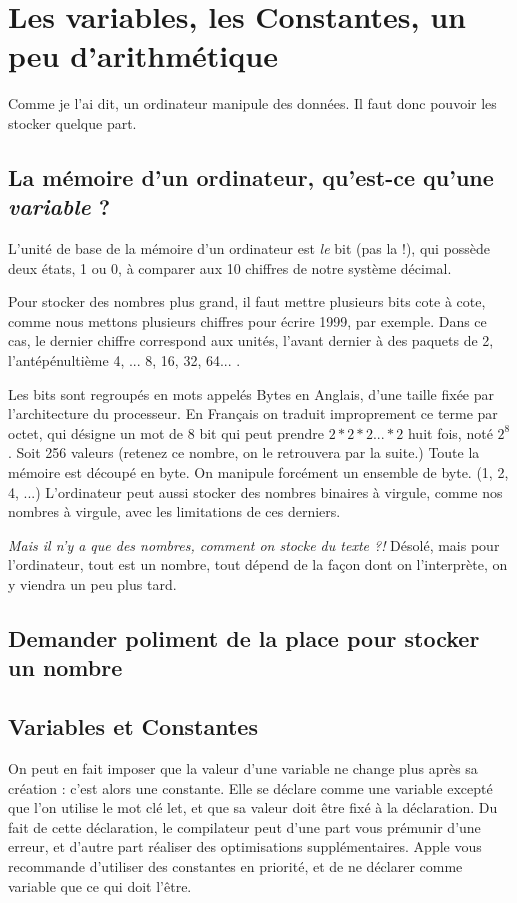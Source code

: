\chapter{Les variables, les Constantes, un peu d'arithmétique}
Comme je l'ai dit, un ordinateur manipule des données. Il faut donc pouvoir les stocker
quelque part.
\section{La mémoire d'un ordinateur, qu'est-ce qu'une \emph{variable} ?}
L'unité de base de la mémoire d'un ordinateur est \emph{le} bit (pas la !), qui possède deux états,
1 ou 0, à comparer aux 10 chiffres de notre système décimal.

Pour stocker des nombres
plus grand, il faut mettre plusieurs bits cote à cote, comme nous mettons plusieurs chiffres
pour écrire 1999, par exemple. Dans ce cas, le dernier chiffre correspond aux unités, l'avant dernier à
des paquets de 2, l'antépénultième 4, ... 8, 16, 32, 64... .

Les bits sont regroupés en mots
appelés Bytes en Anglais, d'une taille fixée par l'architecture du processeur. En Français
on traduit improprement ce terme par octet, qui désigne un mot de 8 bit qui peut prendre
\begin{math}2*2*2...*2\end{math} huit fois, noté \begin{math} 2^{8} \end{math}. Soit 256 valeurs (retenez ce nombre, on le retrouvera par la suite.)
Toute la mémoire est découpé en byte. On manipule forcément un ensemble de byte. (1,
2, 4, ...)
L'ordinateur peut aussi stocker des nombres binaires à virgule, comme nos nombres à virgule, avec les limitations de ces derniers. %

\emph{Mais il n'y a que des nombres, comment on stocke du texte ?!}
Désolé, mais pour l'ordinateur, tout est un nombre, tout dépend de la façon dont on
l'interprète, on y viendra un peu plus tard.
\section{Demander poliment de la place pour stocker un nombre}

\section{Variables et Constantes}
On peut en fait imposer que la valeur d'une variable ne change plus après sa création :
c'est alors une constante. Elle se déclare comme une variable excepté que l'on utilise le
mot clé let, et que sa valeur doit être fixé à la déclaration.
Du fait de cette déclaration, le compilateur peut d'une part vous prémunir d'une erreur, et
d'autre part réaliser des optimisations supplémentaires. Apple vous recommande d'utiliser
des constantes en priorité, et de ne déclarer comme variable que ce qui doit l'être.
